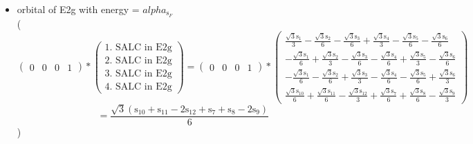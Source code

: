 \documentclass[12pt,a4paper]{article}
\begin{document}
\begin{itemize}
\textcolor{red}{Error in Orthogonalization of SALCs}\textcolor{red}{Error in Orthogonalization of SALCs}\textcolor{red}{Error in Orthogonalization of SALCs}\item orbital of E2g with energy = 
                                $alpha_{\text{s}_F}$ \\
( 
$$
\begin{pmatrix}0 & 0 & 0 & 1\end{pmatrix} * \left(\begin{array}{c}\text{1. SALC in E2g} \\ \text{2. SALC in E2g} \\ \text{3. SALC in E2g} \\ \text{4. SALC in E2g}\end{array}\right) = \begin{pmatrix}0 & 0 & 0 & 1\end{pmatrix} * \begin{pmatrix}\frac{\sqrt{3} \text{s}_{1}}{3} - \frac{\sqrt{3} \text{s}_{2}}{6} - \frac{\sqrt{3} \text{s}_{3}}{6} + \frac{\sqrt{3} \text{s}_{4}}{3} - \frac{\sqrt{3} \text{s}_{5}}{6} - \frac{\sqrt{3} \text{s}_{6}}{6}\\- \frac{\sqrt{3} \text{s}_{1}}{6} + \frac{\sqrt{3} \text{s}_{2}}{3} - \frac{\sqrt{3} \text{s}_{3}}{6} - \frac{\sqrt{3} \text{s}_{4}}{6} + \frac{\sqrt{3} \text{s}_{5}}{3} - \frac{\sqrt{3} \text{s}_{6}}{6}\\- \frac{\sqrt{3} \text{s}_{1}}{6} - \frac{\sqrt{3} \text{s}_{2}}{6} + \frac{\sqrt{3} \text{s}_{3}}{3} - \frac{\sqrt{3} \text{s}_{4}}{6} - \frac{\sqrt{3} \text{s}_{5}}{6} + \frac{\sqrt{3} \text{s}_{6}}{3}\\\frac{\sqrt{3} \text{s}_{10}}{6} + \frac{\sqrt{3} \text{s}_{11}}{6} - \frac{\sqrt{3} \text{s}_{12}}{3} + \frac{\sqrt{3} \text{s}_{7}}{6} + \frac{\sqrt{3} \text{s}_{8}}{6} - \frac{\sqrt{3} \text{s}_{9}}{3}\end{pmatrix} 
 $$ $$ = \frac{\sqrt{3} \left(\text{s}_{10} + \text{s}_{11} - 2 \text{s}_{12} + \text{s}_{7} + \text{s}_{8} - 2 \text{s}_{9}\right)}{6} 
 $$ 
 )


\end{itemize}
\end{document}
